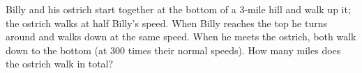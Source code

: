 Billy and his ostrich start together at the bottom of a $3$-mile hill and walk up it; the ostrich walks at half Billy's speed. When Billy reaches the top he turns around and walks down at the same speed. When he meets the ostrich, both walk down to the bottom (at $300$ times their normal speeds). How many miles does the ostrich walk in total?

